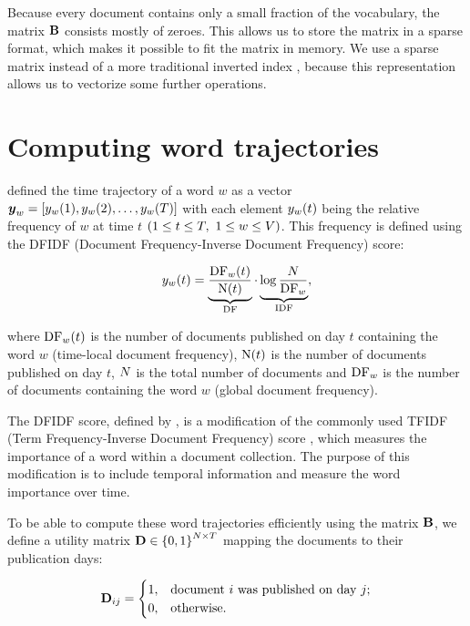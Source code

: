 Because every document contains only a small fraction of the vocabulary, the matrix $\mathbf{B}$ consists mostly of zeroes. This allows us to store the matrix in a sparse format, which makes it possible to fit the matrix in memory. We use a sparse matrix instead of a more traditional inverted index \citep{information-retrieval}, because this representation allows us to vectorize some further operations.


\section{Computing word trajectories}
\cite{event-detection} defined the time trajectory of a word $w$ as a vector\\ $\vect{\traj}_{w} = \left[ \traj_{w}(1), \traj_{w}(2), \dots, \traj_{w}(\streamlen) \right]$ with each element $y_{w}(t)$ being the relative frequency of $w$ at time $t$ $(1 \leq t \leq T,\ 1 \leq w \leq V)$. This frequency is defined using the DFIDF (Document Frequency-Inverse Document Frequency) score:

\begin{equation}
	y_{w}(t) = \underbrace{\frac{\text{DF}_{w}(t)}{\text{N}(t)}}_{\text{DF}} \cdot \underbrace{\log{\frac{N}{\text{DF}_{w}}}}_{\text{IDF}},
\end{equation}

where $\text{DF}_{w}(t)$ is the number of documents published on day $t$ containing the word $w$ (time-local document frequency), $\text{N}(t)$ is the number of documents published on day $t$, $N$ is the total number of documents and $\text{DF}_{w}$ is the number of documents containing the word $w$ (global document frequency).

The DFIDF score, defined by \cite{event-detection}, is a modification of the commonly used TFIDF (Term Frequency-Inverse Document Frequency) score \citep{tfidf, information-retrieval}, which measures the importance of a word within a document collection. The purpose of this modification is to include temporal information and measure the word importance over time.

To be able to compute these word trajectories efficiently using the matrix $\mathbf{B}$, we define a utility matrix $\mathbf{D} \in \left\{ 0, 1 \right\}^{N \times T}$ mapping the documents to their publication days:

\begin{equation}
	\mathbf{D}_{ij} =
	\begin{cases}
		1, & \text{document}~i~\text{was published on day}~j \text{;} \\
		0, & \text{otherwise}.
	\end{cases}
\end{equation}

